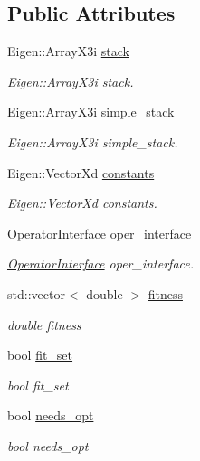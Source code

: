 \subsection*{Public Attributes}
\begin{DoxyCompactItemize}
\item 
Eigen\+::\+Array\+X3i \hyperlink{classAcyclicGraph_a0289993135a2d37ae5eaf5701801500f}{stack}
\begin{DoxyCompactList}\small\item\em Eigen\+::\+Array\+X3i stack. \end{DoxyCompactList}\item 
Eigen\+::\+Array\+X3i \hyperlink{classAcyclicGraph_acea3997a10f2fe2acc6226f629413feb}{simple\+\_\+stack}
\begin{DoxyCompactList}\small\item\em Eigen\+::\+Array\+X3i simple\+\_\+stack. \end{DoxyCompactList}\item 
Eigen\+::\+Vector\+Xd \hyperlink{classAcyclicGraph_a06e93c34292ca14a3e963b2c2cc4b57a}{constants}
\begin{DoxyCompactList}\small\item\em Eigen\+::\+Vector\+Xd constants. \end{DoxyCompactList}\item 
\hyperlink{classOperatorInterface}{Operator\+Interface} \hyperlink{classAcyclicGraph_a82c104a4c80268bd7705be59c99b73c7}{oper\+\_\+interface}
\begin{DoxyCompactList}\small\item\em \hyperlink{classOperatorInterface}{Operator\+Interface} oper\+\_\+interface. \end{DoxyCompactList}\item 
std\+::vector$<$ double $>$ \hyperlink{classAcyclicGraph_a01d92c1b852c41e7a6fdf1085861b5bd}{fitness}
\begin{DoxyCompactList}\small\item\em double fitness \end{DoxyCompactList}\item 
bool \hyperlink{classAcyclicGraph_aa1003d4eb327ef21a1084efcdaeb953a}{fit\+\_\+set}
\begin{DoxyCompactList}\small\item\em bool fit\+\_\+set \end{DoxyCompactList}\item 
bool \hyperlink{classAcyclicGraph_adad7dd87ced7e2cae5a1ec20a6936ef6}{needs\+\_\+opt}
\begin{DoxyCompactList}\small\item\em bool needs\+\_\+opt \end{DoxyCompactList}\item 

\end{DoxyCompactItemize}
